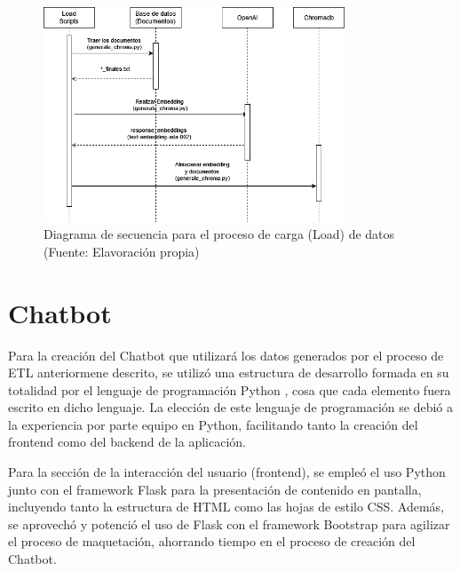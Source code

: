 \begin{figure}[ht!]
    \centering
    \includegraphics[width=0.8\textwidth]{figures/load_diagram.png}
    \caption[Diagrama de secuencia para el proceso de carga (Load) de datos]{Diagrama de secuencia para el proceso de carga (Load)  de datos\\
    {\scriptsize (Fuente: Elavoración propia)}}
    \label{fig:load_diagram}
\end{figure}

\newpage



\section{Chatbot}

   
Para la creación del Chatbot que utilizará los datos generados por el proceso de ETL anteriormene descrito, se utilizó
una estructura de desarrollo formada en su totalidad por el lenguaje de programación Python \cite{pythonWelcomePythonorg}, cosa que cada elemento fuera escrito en dicho lenguaje. 
La elección de este lenguaje de programación se debió a la experiencia por parte equipo en Python, facilitando tanto la creación del frontend como del backend de la aplicación.

Para la sección de la interacción del usuario (frontend), se empleó el uso Python junto con el framework Flask \cite{flask1} para la presentación  
de contenido en pantalla, incluyendo tanto la estructura de HTML como las hojas de estilo CSS. Además, se aprovechó y potenció el uso de Flask con el  
framework Bootstrap para agilizar el proceso de maquetación, ahorrando tiempo en el proceso de creación del Chatbot.

